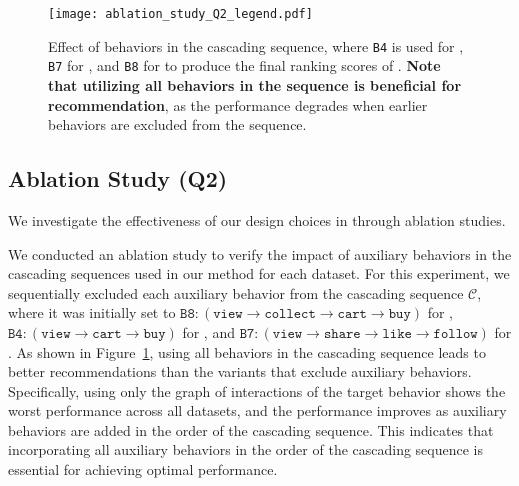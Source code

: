\begin{figure}[t]
    \centering
    \texttt{[image: ablation\_study\_Q2\_legend.pdf]}
    
    \caption{
        \label{fig:experiments:ablationstudy}
        Effect of behaviors in the cascading sequence, where \texttt{B4} is used for \method, \texttt{B7} for \tenrec, and \texttt{B8} for \tmall to produce the final ranking scores of \method.
        \textbf{Note that utilizing all behaviors in the sequence is beneficial for recommendation}, as the performance degrades when earlier behaviors are excluded from the sequence.
    }
\end{figure}


\subsection{Ablation Study (Q2)}
We investigate the effectiveness of our design choices in \method through ablation studies.

We conducted an ablation study to verify the impact of auxiliary behaviors in the cascading sequences used in our method for each dataset.
For this experiment, we sequentially excluded each auxiliary behavior from the cascading sequence $\mathcal{C}$, where it was initially set to $\texttt{B8}: (\texttt{view}\rightarrow\texttt{collect}\rightarrow\texttt{cart}\rightarrow\texttt{buy})$ for \tmall, $\texttt{B4}:(\texttt{view}\rightarrow\texttt{cart}\rightarrow\texttt{buy})$ for \taobao, and $\texttt{B7}:(\texttt{view}\rightarrow\texttt{share}\rightarrow\texttt{like}\rightarrow\texttt{follow})$ for \tenrec.
As shown in Figure~\ref{fig:experiments:ablationstudy}, using all behaviors in the cascading sequence leads to better recommendations than the variants that exclude auxiliary behaviors.
Specifically, using only the graph of interactions of the target behavior shows the worst performance across all datasets, and the performance improves as auxiliary behaviors are added in the order of the cascading sequence.
This indicates that incorporating all auxiliary behaviors in the order of the cascading sequence is essential for achieving optimal performance.

